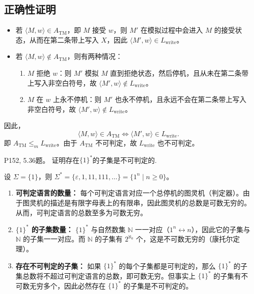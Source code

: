 \documentclass[11pt,addpoints,answers]{exam}
\begin{document}
\begin{questions}
\begin{solution}
\subsection*{正确性证明}
\begin{itemize}
    \item 若 $\langle M, w \rangle \in A_{\text{TM}}$，即 $M$ 接受 $w$，则 $M'$ 在模拟过程中会进入 $M$ 的接受状态，从而在第二条带上写入 $X$，因此 $\langle M', w \rangle \in L_{\text{write}}$。
    \item 若 $\langle M, w \rangle \notin A_{\text{TM}}$，则有两种情况：
        \begin{enumerate}
            \item $M$ 拒绝 $w$：则 $M'$ 模拟 $M$ 直到拒绝状态，然后停机，且从未在第二条带上写入非空白符号，故 $\langle M', w \rangle \notin L_{\text{write}}$。
            \item $M$ 在 $w$ 上永不停机：则 $M'$ 也永不停机，且永远不会在第二条带上写入非空白符号，故 $\langle M', w \rangle \notin L_{\text{write}}$。
        \end{enumerate}
    \end{itemize}
    因此，
    \[
    \langle M, w \rangle \in A_{\text{TM}} \iff \langle M', w \rangle \in L_{\text{write}}.
    \]
    即 $A_{\text{TM}} \leq_m L_{\text{write}}$。由于 $A_{\text{TM}}$ 不可判定，故 $L_{\text{write}}$ 也不可判定。
\end{solution}


\question P152, 5.36题。
证明存在$\{1\}^*$的子集是不可判定的.
\begin{solution}
	设 $\Sigma = \{1\}$，则 $\Sigma^* = \{ \varepsilon, 1, 11, 111, \dots \} = \{1^n \mid n \ge 0\}$。

    \begin{enumerate}
        \item \textbf{可判定语言的数量：}
        每个可判定语言对应一个总停机的图灵机（判定器）。由于图灵机的描述是有限字母表上的有限串，因此图灵机的总数是可数无穷的。从而，可判定语言的总数至多为可数无穷。
    
        \item \textbf{$\{1\}^*$ 的子集数量：}
        $\{1\}^*$ 与自然数集 $\mathbb{N}$ 一一对应（$1^n \leftrightarrow n$），因此它的子集与 $\mathbb{N}$ 的子集一一对应。而 $\mathbb{N}$ 的子集有 $2^{\aleph_0}$ 个，这是不可数无穷的（康托尔定理）。
    
        \item \textbf{存在不可判定的子集：}
        如果 $\{1\}^*$ 的每个子集都是可判定的，那么 $\{1\}^*$ 的子集总数将不超过可判定语言的总数，即可数无穷。但事实上 $\{1\}^*$ 的子集有不可数无穷多个，因此必然存在 $\{1\}^*$ 的子集是不可判定的。
    

\end{enumerate}
\end{solution}
\end{questions}
\end{document}
